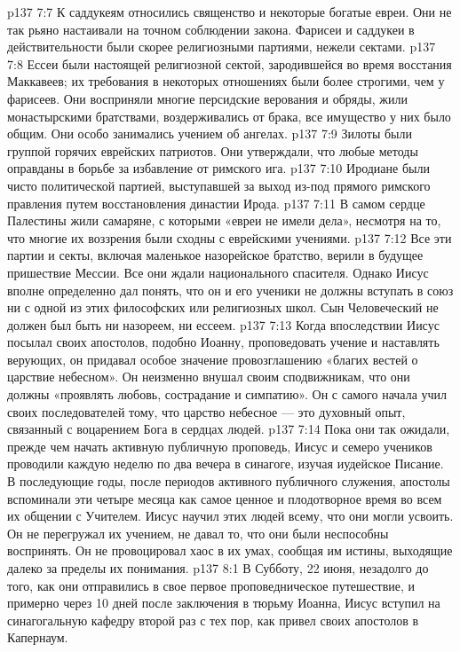 \vs p137 7:7 \pc К саддукеям относились священство и некоторые богатые евреи. Они не так рьяно настаивали на точном соблюдении закона. Фарисеи и саддукеи в действительности были скорее религиозными партиями, нежели сектами.
\vs p137 7:8 \pc Ессеи были настоящей религиозной сектой, зародившейся во время восстания Маккавеев; их требования в некоторых отношениях были более строгими, чем у фарисеев. Они восприняли многие персидские верования и обряды, жили монастырскими братствами, воздерживались от брака, все имущество у них было общим. Они особо занимались учением об ангелах.
\vs p137 7:9 \pc Зилоты были группой горячих еврейских патриотов. Они утверждали, что любые методы оправданы в борьбе за избавление от римского ига.
\vs p137 7:10 \pc Иродиане были чисто политической партией, выступавшей за выход из\hyp{}под прямого римского правления путем восстановления династии Ирода.
\vs p137 7:11 \pc В самом сердце Палестины жили самаряне, с которыми «евреи не имели дела», несмотря на то, что многие их воззрения были сходны с еврейскими учениями.
\vs p137 7:12 \pc Все эти партии и секты, включая маленькое назорейское братство, верили в будущее пришествие Мессии. Все они ждали национального спасителя. Однако Иисус вполне определенно дал понять, что он и его ученики не должны вступать в союз ни с одной из этих философских или религиозных школ. Сын Человеческий не должен был быть ни назореем, ни ессеем.
\vs p137 7:13 Когда впоследствии Иисус посылал своих апостолов, подобно Иоанну, проповедовать учение и наставлять верующих, он придавал особое значение провозглашению «благих вестей о царствие небесном». Он неизменно внушал своим сподвижникам, что они должны «проявлять любовь, сострадание и симпатию». Он с самого начала учил своих последователей тому, что царство небесное --- это духовный опыт, связанный с воцарением Бога в сердцах людей.
\vs p137 7:14 Пока они так ожидали, прежде чем начать активную публичную проповедь, Иисус и семеро учеников проводили каждую неделю по два вечера в синагоге, изучая иудейское Писание. В последующие годы, после периодов активного публичного служения, апостолы вспоминали эти четыре месяца как самое ценное и плодотворное время во всем их общении с Учителем. Иисус научил этих людей всему, что они могли усвоить. Он не перегружал их учением, не давал то, что они были неспособны воспринять. Он не провоцировал хаос в их умах, сообщая им истины, выходящие далеко за пределы их понимания.
\vs p137 8:1 В Субботу, 22 июня, незадолго до того, как они отправились в свое первое проповедническое путешествие, и примерно через 10 дней после заключения в тюрьму Иоанна, Иисус вступил на синагогальную кафедру второй раз с тех пор, как привел своих апостолов в Капернаум.
